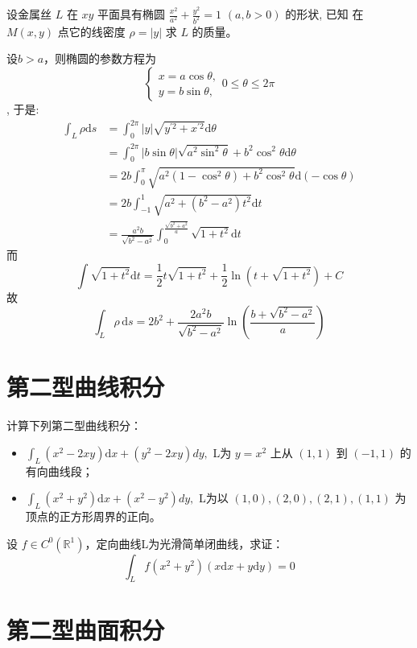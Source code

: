 \begin{problem}
    设金属丝 \(L\) 在 \(xy\) 平面具有椭圆 \(\frac{x^2}{a^2} + \frac{y^2}{b^2} =
    1\) \((a, b > 0)\) 的形状, 已知
    在 \(M(x, y)\) 点它的线密度 \(\rho = |y|\) 求 \(L\) 的质量。
\end{problem}

\begin{solution}
    设\(b>a\)，则椭圆的参数方程为 \[
        \begin{cases}
            x = a\cos\theta, \\
            y = b\sin\theta,
        \end{cases} 0\leq\theta\leq2\pi
    \], 于是:
    \begin{align*}
        \int_{L} \rho \mathrm{d}s &= \int_{0}^{2\pi} \left| y \right|
        \sqrt{y^{'2}+x^{'2}} \mathrm{d}\theta\\
        &=\int_{0}^{2\pi} \left| b\sin\theta \right|
        \sqrt{a^{2}\sin^{2}\theta}+b^{2}\cos^{2}\theta \mathrm{d}\theta \\
        &= 2b  \int_{0}^{\pi} \sqrt{a^{2}\left( 1-\cos^{2}\theta
        \right) + b^{2}\cos^{2}\theta } \mathrm{d}(-\cos\theta) \\
        &= 2b \int_{-1}^{1} \sqrt{a^{2}+\left( b^{2}-a^{2}
        \right)t^{2}} \mathrm{d}t\\
        &= \frac{a^{2}b}{\sqrt{b^{2}-a^{2}}}
        \int_{0}^{\frac{\sqrt{b^{2}+a^{2}}}{a}} \sqrt{1+t^{2}} \mathrm{d}t
    \end{align*}
    而\[
        \int \sqrt{1+t^{2}} \mathrm{d}t = \frac{1}{2}t\sqrt{1+t^{2}} +
        \frac{1}{2}\ln\left( t+\sqrt{1+t^{2}} \right) + C
    \]
    故\[
        \int_{L} \rho \, \mathrm{d}s =
        2b^{2}+\frac{2a^{2}b}{\sqrt{b^{2}-a^{2}}}\ln\left(
        \frac{b+\sqrt{b^{2}-a^{2}}}{a} \right)
    \]
\end{solution}
\section{第二型曲线积分}
\begin{problem}
    计算下列第二型曲线积分：
    \begin{itemize}
        \item \(\int_L (x^2 - 2xy) \mathrm{d}x + (y^2 - 2xy) dy, \) L为 \(y =
            x^2\) 上从 \((1, 1)\) 到 \((-1, 1)\) 的有向曲线段；
        \item \( \int_L (x^2 + y^2) \mathrm{d}x + (x^2 - y^2) dy, \) L为以 \((1,
            0), (2, 0), (2, 1), (1, 1)\) 为顶点的正方形周界的正向。
    \end{itemize}
\end{problem}

\begin{problem}
    设 \(f \in C^0(\mathbb{R}^1)\)，定向曲线L为光滑简单闭曲线，求证：
    \[
        \int_L f(x^2 + y^2)(x \mathrm{d}x + y \mathrm{d}y) = 0
    \]
\end{problem}

\section{第二型曲面积分}
